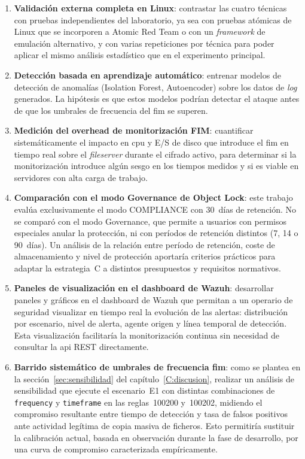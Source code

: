 \documentclass[../main.tex]{subfiles}
\begin{document}
\begin{enumerate}[label=TF\arabic*., leftmargin=2.5cm]
  \item \textbf{Validación externa completa en Linux}: contrastar las cuatro
  técnicas con pruebas independientes del laboratorio, ya sea con pruebas atómicas
  de Linux que se incorporen a Atomic Red Team o con un \emph{framework} de
  emulación alternativo, y con varias repeticiones por técnica para poder aplicar
  el mismo análisis estadístico que en el experimento principal.

  \item \textbf{Detección basada en aprendizaje automático}: entrenar modelos de
  detección de anomalías (Isolation Forest, Autoencoder) sobre los datos de
  \emph{log} generados. La hipótesis es que estos modelos podrían detectar el
  ataque antes de que los umbrales de frecuencia del \gls{fim} se superen.

  \item \textbf{Medición del overhead de monitorización FIM}: cuantificar
  sistemáticamente el impacto en \gls{cpu} y E/S de disco que introduce el
  \gls{fim} en tiempo real sobre el \emph{fileserver} durante el cifrado activo,
  para determinar si la monitorización introduce algún sesgo en los tiempos medidos
  y si es viable en servidores con alta carga de trabajo.

  \item \textbf{Comparación con el modo Governance de Object Lock}: este trabajo
  evalúa exclusivamente el modo COMPLIANCE con 30~días de retención. No se comparó
  con el modo Governance, que permite a usuarios con permisos especiales anular la
  protección, ni con períodos de retención distintos (7, 14 o 90~días). Un análisis
  de la relación entre período de retención, coste de almacenamiento y nivel de
  protección aportaría criterios prácticos para adaptar la estrategia~C a distintos
  presupuestos y requisitos normativos.

  \item \textbf{Paneles de visualización en el dashboard de Wazuh}: desarrollar
  paneles y gráficos en el dashboard de Wazuh que permitan a un operario de
  seguridad visualizar en tiempo real la evolución de las alertas: distribución
  por escenario, nivel de alerta, agente origen y línea temporal de detección.
  Esta visualización facilitaría la monitorización continua sin necesidad de
  consultar la \gls{api} REST directamente.

  \item \textbf{Barrido sistemático de umbrales de frecuencia \gls{fim}}:
  como se plantea en la sección~\ref{sec:sensibilidad} del
  capítulo~\ref{C:discusion}, realizar un análisis de sensibilidad que ejecute
  el escenario~E1 con distintas combinaciones de \texttt{frequency} y
  \texttt{timeframe} en las reglas~100200 y~100202, midiendo el compromiso
  resultante entre tiempo de detección y tasa de falsos positivos ante
  actividad legítima de copia masiva de ficheros. Esto permitiría sustituir la
  calibración actual, basada en observación durante la fase de desarrollo, por
  una curva de compromiso caracterizada empíricamente.


\end{enumerate}
\end{document}
